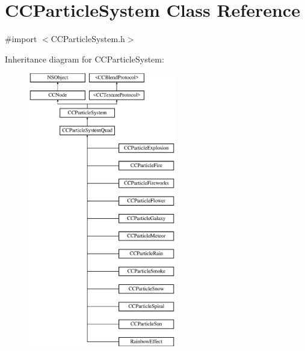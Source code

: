 \hypertarget{interface_c_c_particle_system}{\section{C\-C\-Particle\-System Class Reference}
\label{interface_c_c_particle_system}
}


{\ttfamily \#import $<$C\-C\-Particle\-System.\-h$>$}

Inheritance diagram for C\-C\-Particle\-System\-:\begin{figure}[H]
\begin{center}
\leavevmode
\includegraphics[height=12.000000cm]{interface_c_c_particle_system}
\end{center}
\end{figure}
